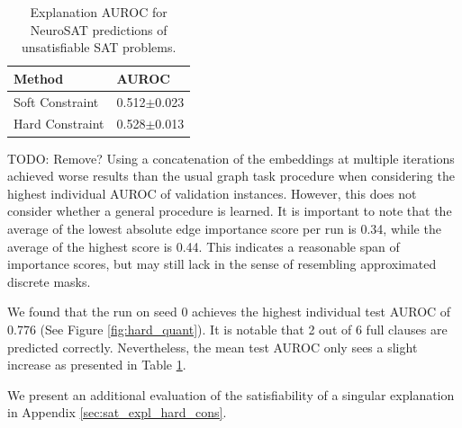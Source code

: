 \begin{table}[ht]
    \centering
    \scriptsize
    \begin{tabularx}{0.35\textwidth}{l*{1}{X}}   %
    \toprule
    \textbf{Method} & \textbf{AUROC} \\
    \midrule
    Soft Constraint & 0.512$\pm$0.023 \\
    \midrule
    Hard Constraint & 0.528$\pm$0.013 \\
    \bottomrule
    \end{tabularx}
    \caption[Inductive performance of explainer on NeuroSAT]{Explanation AUROC for NeuroSAT predictions of unsatisfiable SAT problems.}
    \label{tab:res_neuroSAT}
\end{table}

TODO: Remove? Using a concatenation of the embeddings at multiple iterations achieved worse results than the usual graph task procedure when considering the highest individual AUROC of validation instances. However, this does not consider whether a general procedure is learned. It is important to note that the average of the lowest absolute edge importance score per run is 0.34, while the average of the highest score is 0.44. This indicates a reasonable span of importance scores, but may still lack in the sense of resembling approximated discrete masks.\bigskip

We found that the run on seed 0 achieves the highest individual test AUROC of 0.776 (See Figure \ref{fig:hard_quant}). It is notable that 2 out of 6 full clauses are predicted correctly. Nevertheless, the mean test AUROC only sees a slight increase as presented in Table \ref{tab:res_neuroSAT}. \bigskip

We present an additional evaluation of the satisfiability of a singular explanation in Appendix \ref{sec:sat_expl_hard_cons}. \bigskip

